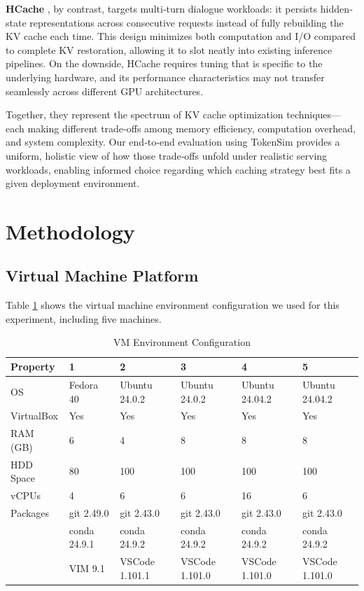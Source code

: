 \documentclass[sigconf,nonacm]{acmart}
\begin{document}
\textbf{HCache} \cite{10.1145/3689031.3696072}, by contrast, targets multi‐turn dialogue workloads: it persists hidden‐state representations across consecutive requests instead of fully rebuilding the KV cache each time. This design minimizes both computation and I/O compared to complete KV restoration, allowing it to slot neatly into existing inference pipelines. On the downside, HCache requires tuning that is specific to the underlying hardware, and its performance characteristics may not transfer seamlessly across different GPU architectures.

Together, they represent the spectrum of KV cache optimization techniques—each making different trade‐offs among memory efficiency, computation overhead, and system complexity. Our end‐to‐end evaluation using TokenSim provides a uniform, holistic view of how those trade‐offs unfold under realistic serving workloads, enabling informed choice regarding which caching strategy best fits a given deployment environment.
\clearpage
\section {Methodology}

\subsection{Virtual Machine Platform}
\label{sec:subsection}
Table \ref{tab:vm_config} shows the virtual machine environment configuration we used for this experiment, including five machines. 
 \vspace{-5pt}
\begin{table}[H]
\centering
\caption{VM Environment Configuration}
\label{tab:vm_config}
\begin{tabular}{@{}l|p{}p{}p{}p{}p{}@{}}
\toprule
\textbf{Property} & \textbf{1} & \textbf{2} & \textbf{3} & \textbf{4} & \textbf{5}     \\
\midrule
OS & Fedora 40&Ubuntu 24.0.2&Ubuntu 24.0.2 &Ubuntu 24.04.2&Ubuntu 24.04.2  \\
VirtualBox & Yes & Yes & Yes & Yes & Yes  \\
RAM (GB)& 6 & 4 & 8 & 8 & 8   \\
HDD Space  & 80 & 100  & 100 & 100& 100   \\
vCPUs & 4 & 6 & 6 & 16 & 6   \\
Packages  & git 2.49.0 & git 2.43.0 & git 2.43.0 & git 2.43.0 & git 2.43.0  \\
  & conda 24.9.1 & conda 24.9.2 & conda 24.9.2& conda 24.9.2& conda 24.9.2  \\
  & VIM 9.1 & VSCode 1.101.1  & VSCode 1.101.0 & VSCode 1.101.0& VSCode 1.101.0 \\
\bottomrule
\end{tabular}
\end{table}
\end{document}
